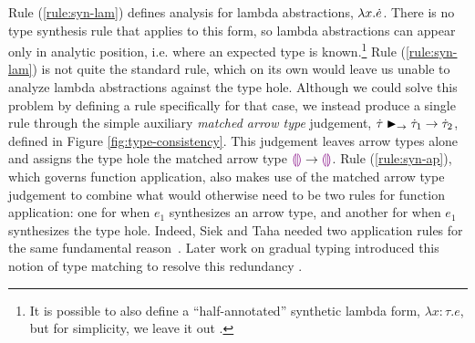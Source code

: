 Rule (\ref{rule:syn-lam}) defines analysis for lambda abstractions,
$\lambda x.\dot{e}$. There is no type synthesis rule that applies  
to this form, so lambda abstractions can appear only in analytic position,
i.e. where an expected type is known.\footnote{It is possible to also define a
  ``half-annotated'' synthetic lambda form, $\lambda x{:}\tau.e$, but for
  simplicity, we leave it out \cite{DBLP:conf/tldi/ChlipalaPH05}.}  Rule
(\ref{rule:syn-lam}) is not quite the standard rule,
%
which on its own would leave us unable to analyze
lambda abstractions against the type hole.
Although we could solve this problem by defining a rule 
specifically for that case, we 
instead produce a single rule through the
simple auxiliary \emph{matched arrow type} judgement,
$\dot{\tau} \blacktriangleright_{\rightarrow} \dot{\tau}_1 \rightarrow \dot{\tau}_2$, defined in Figure
\ref{fig:type-consistency}. This judgement leaves arrow types alone and
assigns the type hole the matched arrow type $\textcolor{violet}{\llparenthesis}\textcolor{violet}{\rrparenthesis} \rightarrow \textcolor{violet}{\llparenthesis}\textcolor{violet}{\rrparenthesis}$.  
Rule (\ref{rule:syn-ap}), which governs function
application, also makes use of the matched arrow type judgement to
combine what would otherwise need to be two rules for function application:
one for when $e_1$ synthesizes an arrow type, and another for when $e_1$
synthesizes the type hole. Indeed, Siek and Taha needed two application
rules for the same fundamental reason~\cite{Siek06a}. Later work on gradual
typing introduced this notion of type matching to resolve this redundancy \cite{DBLP:conf/popl/CiminiS16,DBLP:conf/popl/GarciaC15,DBLP:conf/popl/RastogiCH12}.


